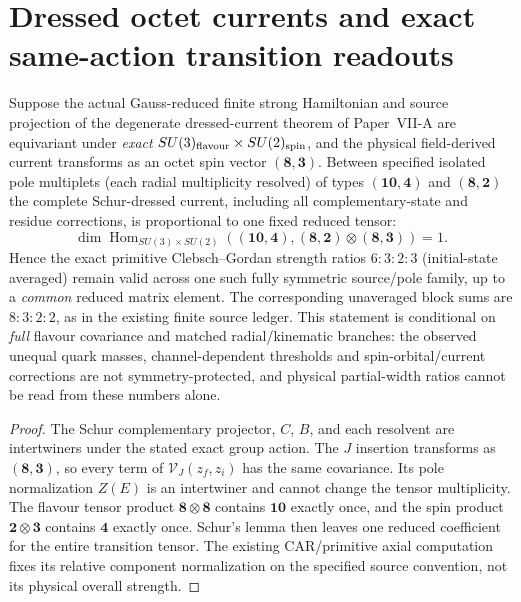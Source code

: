 \documentclass[12pt,a4paper]{article}
\begin{document}
\section{Dressed octet currents and exact same-action transition readouts}
\label{p11:sec:v375-dressed-baryon-transition}
\begin{corollary}
\label{p11:cor:v375-dressed-axial-reduced-tensor}
Suppose the actual Gauss-reduced finite strong Hamiltonian and
source projection of the degenerate dressed-current theorem of Paper~VII-A
are equivariant under \emph{exact} $SU(3)_{\rm flavour}\times SU(2)_{\rm spin}$,
and the physical field-derived current transforms as an octet spin
vector $(\mathbf8,\mathbf3)$.
Between specified isolated pole multiplets (each radial multiplicity resolved) of types
$(\mathbf{10},\mathbf4)$ and $(\mathbf8,\mathbf2)$ the complete
Schur-dressed current, including all complementary-state and residue
corrections, is proportional to one fixed reduced tensor:
\[
\boxed{\dim\operatorname{Hom}_{SU(3)\times SU(2)}
 ((\mathbf{10},\mathbf4),
  (\mathbf8,\mathbf2)\otimes(\mathbf8,\mathbf3))=1.}
\]
Hence the exact primitive Clebsch--Gordan strength ratios
$6:3:2:3$ (initial-state averaged) remain valid across one such
fully symmetric source/pole family, up to a \emph{common} reduced
matrix element. The corresponding unaveraged block sums are
$8:3:2:2$, as in the existing finite source ledger.
This statement is conditional on \emph{full} flavour covariance and
matched radial/kinematic branches: the observed unequal quark masses,
channel-dependent thresholds and spin-orbital/current corrections
are not symmetry-protected, and physical partial-width ratios cannot
be read from these numbers alone.
\end{corollary}
\begin{proof}
The Schur complementary projector, $C$, $B$, and each resolvent are
intertwiners under the stated exact group action. The $J$ insertion
transforms as $(\mathbf8,\mathbf3)$, so every term of
$\mathcal V_J(z_f,z_i)$ has the same covariance. Its pole normalization
$Z(E)$ is an intertwiner and cannot change the tensor multiplicity.
The flavour tensor product $\mathbf8\otimes\mathbf8$ contains
$\mathbf{10}$ exactly once, and the spin product
$\mathbf2\otimes\mathbf3$ contains $\mathbf4$ exactly once.
Schur's lemma then leaves one reduced coefficient for the entire
transition tensor. The existing CAR/primitive axial computation
fixes its relative component normalization on the specified
source convention, not its physical overall strength.
\end{proof}
\end{document}

